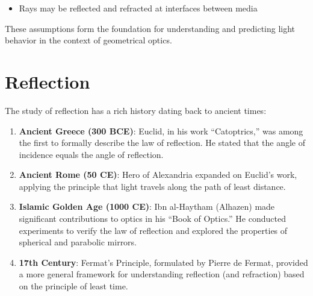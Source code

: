 \documentclass[
  a4paper,
]{book}
\providecommand{\tightlist}{%
  \setlength{\itemsep}{0pt}\setlength{\parskip}{0pt}}
\begin{document}
\begin{tcolorbox}
\begin{enumerate}
  \begin{itemize}
  \tightlist
  \item
    Rays may be reflected and refracted at interfaces between media
  \end{itemize}
\end{enumerate}

These assumptions form the foundation for understanding and predicting
light behavior in the context of geometrical optics.

\end{tcolorbox}

\chapter{Reflection}\label{reflection}

\begin{tcolorbox}[enhanced jigsaw, breakable, toptitle=1mm, bottomrule=.15mm, colbacktitle=quarto-callout-note-color!10!white, title=\textcolor{quarto-callout-note-color}{\faInfo}\hspace{0.5em}{Historical Context of Reflection Laws}, arc=.35mm, rightrule=.15mm, bottomtitle=1mm, opacityback=0, toprule=.15mm, coltitle=black, leftrule=.75mm, opacitybacktitle=0.6, colback=white, left=2mm, titlerule=0mm, colframe=quarto-callout-note-color-frame]

The study of reflection has a rich history dating back to ancient times:

\begin{enumerate}
\def\labelenumi{\arabic{enumi}.}
\item
  \textbf{Ancient Greece (300 BCE)}: Euclid, in his work ``Catoptrics,''
  was among the first to formally describe the law of reflection. He
  stated that the angle of incidence equals the angle of reflection.
\item
  \textbf{Ancient Rome (50 CE)}: Hero of Alexandria expanded on Euclid's
  work, applying the principle that light travels along the path of
  least distance.
\item
  \textbf{Islamic Golden Age (1000 CE)}: Ibn al-Haytham (Alhazen) made
  significant contributions to optics in his ``Book of Optics.'' He
  conducted experiments to verify the law of reflection and explored the
  properties of spherical and parabolic mirrors.
\item
  \textbf{17th Century}: Fermat's Principle, formulated by Pierre de
  Fermat, provided a more general framework for understanding reflection
  (and refraction) based on the principle of least time.
\end{enumerate}


\end{tcolorbox}
\end{document}
